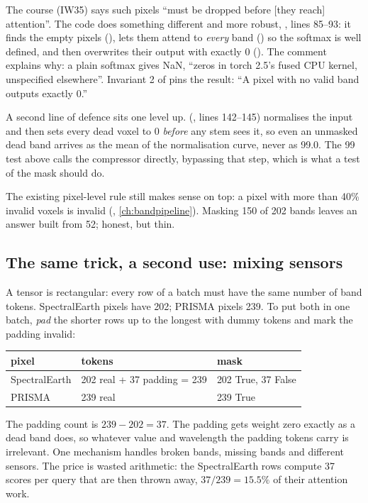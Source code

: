 \begin{sourcenote}
The course (IW35) says such pixels ``must be dropped before [they reach] attention''. The code does something different and more robust, , lines 85--93: it finds the empty pixels (), lets them attend to \emph{every} band () so the softmax is well defined, and then overwrites their output with exactly 0 (). The comment explains why: a plain softmax gives NaN, ``zeros in torch 2.5's fused CPU kernel, unspecified elsewhere''. Invariant 2 of  pins the result: ``A pixel with no valid band outputs exactly 0.''

A second line of defence sits one level up.  (, lines 142--145) normalises the input and then sets every dead voxel to 0 \emph{before} any stem sees it, so even an unmasked dead band arrives as the mean of the normalisation curve, never as 99.0. The 99 test above calls the compressor directly, bypassing that step, which is what a test of the mask should do.
\end{sourcenote}

The existing pixel-level rule still makes sense on top: a pixel with more than 40\% invalid voxels is invalid (, \cref{ch:bandpipeline}). Masking 150 of 202 bands leaves an answer built from 52; honest, but thin.

\subsection{The same trick, a second use: mixing sensors}\label{sec:crossstem:padding}

A tensor is rectangular: every row of a batch must have the same number of band tokens. SpectralEarth pixels have 202; PRISMA pixels 239. To put both in one batch, \emph{pad} the shorter rows up to the longest with dummy tokens and mark the padding invalid:
\begin{center}
\begin{tabular}{lll}\toprule
pixel & tokens & mask\\\midrule
SpectralEarth & 202 real + 37 padding = 239 & 202 True, 37 False\\
PRISMA & 239 real & 239 True\\\bottomrule
\end{tabular}
\end{center}
The padding count is $239 - 202 = 37$. The padding gets weight zero exactly as a dead band does, so whatever value and wavelength the padding tokens carry is irrelevant. One mechanism handles broken bands, missing bands and different sensors. The price is wasted arithmetic: the SpectralEarth rows compute 37 scores per query that are then thrown away, $37/239 = 15.5\%$ of their attention work.

